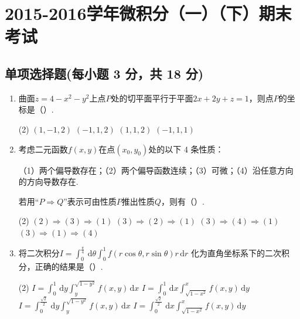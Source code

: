 \documentclass[../main.tex]{subfiles}
\begin{document}
\chapter{2015-2016学年微积分（一）（下）期末考试}

\section{单项选择题(每小题 3 分，共 18 分)}
\begin{enumerate}
  \item 曲面$z=4-x^{2}-y^{2}$上点$P$处的切平面平行于平面$2x+2y+z=1$，则点$P$的坐标是（\qquad）.

        \begin{tasks}[label=\textbf{\Alph*.}, label-width=1.5em, column-sep=1em](2)
          \task $(1,-1,2)$
          \task $(-1,1,2)$
          \task $(1,1,2)$
          \task $(-1,1,1)$
        \end{tasks}

  \item 考虑二元函数$f(x,y)$在点$(x_{0},y_{0})$处的以下 4 条性质：

        （1）两个偏导数存在；（2）两个偏导函数连续；（3）可微；（4）沿任意方向的方向导数存在.

        若用“$P\Rightarrow Q$”表示可由性质$P$推出性质$Q$，则有（\qquad）.

        \begin{tasks}[label=\textbf{\Alph*.}, label-width=1.5em, column-sep=1em](2)
          \task $(2)\Rightarrow(3)\Rightarrow(1)$
          \task $(3)\Rightarrow(2)\Rightarrow(1)$
          \task $(3)\Rightarrow(4)\Rightarrow(1)$
          \task $(3)\Rightarrow(1)\Rightarrow(4)$
        \end{tasks}

  \item 将二次积分$I=\int_{0}^{\frac{\pi}{4}}\,\mathrm{d}\theta\int_{0}^{1}f(r\cos\theta,r\sin\theta)r\,\mathrm{d}r$
        化为直角坐标系下的二次积分，正确的结果是（\qquad）.

        \begin{tasks}[label=\textbf{\Alph*.}, label-width=1.5em, column-sep=1em](2)
          \task $\displaystyle I=\int_{0}^{1}\,\mathrm{d}y\int_{y}^{\sqrt{1-y^{2}}}f(x,y)\,\mathrm{d}x$
          \task $\displaystyle I=\int_{0}^{1}\,\mathrm{d}x\int_{\sqrt{1-x^{2}}}^{x}f(x,y)\,\mathrm{d}y$
          \task $\displaystyle I=\int_{0}^{\frac{\sqrt2}{2}}\,\mathrm{d}y\int_{y}^{\sqrt{1-y^{2}}}f(x,y)\,\mathrm{d}x$
          \task $\displaystyle I=\int_{0}^{\frac{\sqrt2}{2}}\,\mathrm{d}x\int_{\sqrt{1-x^{2}}}^{x}f(x,y)\,\mathrm{d}y$
        \end{tasks}


\end{enumerate}
\end{document}
